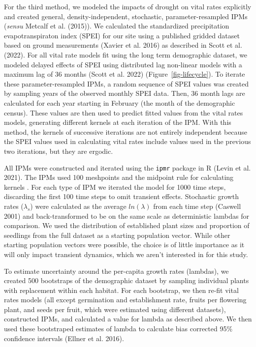 \documentclass[
  12pt,
]{article}
\begin{document}
For the third method, we modeled the impacts of drought on vital rates
explicitly and created general, density-independent, stochastic,
parameter-resampled IPMs (\emph{sensu} Metcalf et al. (2015)). We
calculated the standardized precipitation evapotranspiraton index (SPEI)
for our site using a published gridded dataset based on ground
measurements (Xavier et al. 2016) as described in Scott et al. (2022).
For all vital rate models fit using the long term demographic dataset,
we modeled delayed effects of SPEI using distributed lag non-linear
models with a maximum lag of 36 months (Scott et al. 2022)
(Figure~\ref{fig-lifecycle}). To iterate these parameter-resampled IPMs,
a random sequence of SPEI values was created by sampling years of the
observed monthly SPEI data. Then, 36 month lags are calculated for each
year starting in February (the month of the demographic census). These
values are then used to predict fitted values from the vital rates
models, generating different kernels at each iteration of the IPM. With
this method, the kernels of successive iterations are not entirely
independent because the SPEI values used in calculating vital rates
include values used in the previous two iterations, but they are
ergodic.

All IPMs were constructed and iterated using the \texttt{ipmr} package
in R (Levin et al. 2021). The IPMs used 100 meshpoints and the midpoint
rule for calculating kernels . For each type of IPM we iterated the
model for 1000 time steps, discarding the first 100 time steps to omit
transient effects. Stochastic growth rates (\(\lambda_s\)) were
calculated as the average \(ln(\lambda)\) from each time step (Caswell
2001) and back-transformed to be on the same scale as deterministic
lambdas for comparison. We used the distribution of established plant
sizes and proportion of seedlings from the full dataset as a starting
population vector. While other starting population vectors were
possible, the choice is of little importance as it will only impact
transient dynamics, which we aren't interested in for this study.

To estimate uncertainty around the per-capita growth rates (lambdas), we
created 500 bootstraps of the demographic dataset by sampling individual
plants with replacement within each habitat. For each bootstrap, we then
re-fit vital rates models (all except germination and establishment
rate, fruits per flowering plant, and seeds per fruit, which were
estimated using different datasets), constructed IPMs, and calculated a
value for lambda as described above. We then used these bootstraped
estimates of lambda to calculate bias corrected 95\% confidence
intervals (Ellner et al. 2016).
\end{document}
